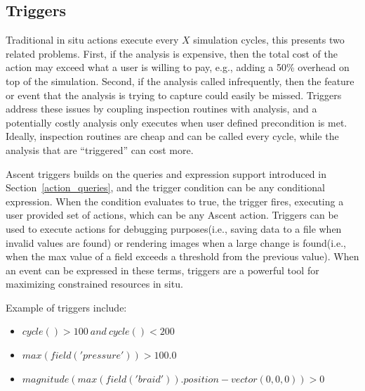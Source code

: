 \subsection{Triggers}
\label{sec:ascent:triggers}
Traditional in situ actions execute every $X$ simulation cycles, this presents
two related problems.
%
First, if the analysis is expensive, then the total cost of the action may exceed
what a user is willing to pay, e.g., adding a 50\% overhead on top of the simulation.
%
Second, if the analysis called infrequently, then the feature or event that the analysis is
trying to capture could easily be missed.
%
Triggers address these issues by coupling inspection routines with analysis, and a
potentially costly analysis only executes when user defined precondition is met.
%
Ideally, inspection routines are cheap and can be called every cycle, while the analysis
that are ``triggered'' can cost more.

Ascent triggers builds on the queries and expression support introduced in
Section~\ref{action_queries}, and the trigger condition can be any conditional
expression.
%
When the condition evaluates to true, the trigger fires, executing a user provided
set of actions, which can be any Ascent action.
%
Triggers can be used to execute actions for debugging purposes(i.e., saving data to
a file when invalid values are found) or rendering images when a large
change is found(i.e., when the max value of a field exceeds a threshold from the
previous value).
%
When an event can be expressed in these terms, triggers are a powerful tool for
maximizing constrained resources in situ.

Example of triggers include:
\begin{itemize}
\item $cycle() > 100 \ and \ cycle() < 200$
\item $max(field('pressure')) > 100.0$
\item $magnitude(max(field('braid')).position - vector(0,0,0)) > 0$
\end{itemize}
